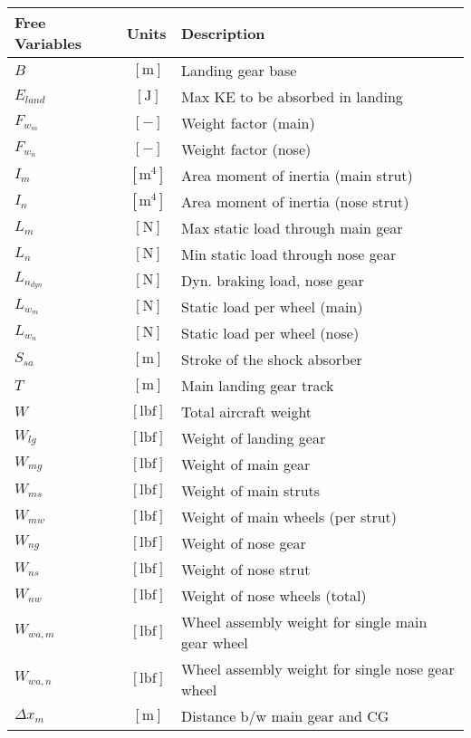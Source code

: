 \documentclass[12pt]{article}
\begin{document}
{\footnotesize
\begin{supertabular}{lcl}
\toprule
Free Variables & Units & Description \\ \midrule
$B$ & $~\mathrm{[m]}$ & Landing gear base \\
$E_{land}$ & $~\mathrm{[J]}$ & Max KE to be absorbed in landing \\
$F_{w_m}$ & $~[-]$ & Weight factor (main) \\
$F_{w_n}$ & $~[-]$ & Weight factor (nose) \\
$I_m$ & $~\mathrm{[m^{4}]}$ & Area moment of inertia (main strut) \\
$I_n$ & $~\mathrm{[m^{4}]}$ & Area moment of inertia (nose strut) \\
$L_m$ & $~\mathrm{[N]}$ & Max static load through main gear \\
$L_n$ & $~\mathrm{[N]}$ & Min static load through nose gear \\
$L_{n_{dyn}}$ & $~\mathrm{[N]}$ & Dyn. braking load, nose gear \\
$L_{w_m}$ & $~\mathrm{[N]}$ & Static load per wheel (main) \\
$L_{w_n}$ & $~\mathrm{[N]}$ & Static load per wheel (nose) \\
$S_{sa}$ & $~\mathrm{[m]}$ & Stroke of the shock absorber \\
$T$ & $~\mathrm{[m]}$ & Main landing gear track \\
$W$ & $~\mathrm{[lbf]}$ & Total aircraft weight \\
$W_{lg}$ & $~\mathrm{[lbf]}$ & Weight of landing gear \\
$W_{mg}$ & $~\mathrm{[lbf]}$ & Weight of main gear \\
$W_{ms}$ & $~\mathrm{[lbf]}$ & Weight of main struts \\
$W_{mw}$ & $~\mathrm{[lbf]}$ & Weight of main wheels (per strut) \\
$W_{ng}$ & $~\mathrm{[lbf]}$ & Weight of nose gear \\
$W_{ns}$ & $~\mathrm{[lbf]}$ & Weight of nose strut \\
$W_{nw}$ & $~\mathrm{[lbf]}$ & Weight of nose wheels (total) \\
$W_{wa,m}$ & $~\mathrm{[lbf]}$ & Wheel assembly weight for single main gear wheel \\
$W_{wa,n}$ & $~\mathrm{[lbf]}$ & Wheel assembly weight for single nose gear wheel \\
$\Delta x_m$ & $~\mathrm{[m]}$ & Distance b/w main gear and CG \\

\end{supertabular}}
\end{document}
